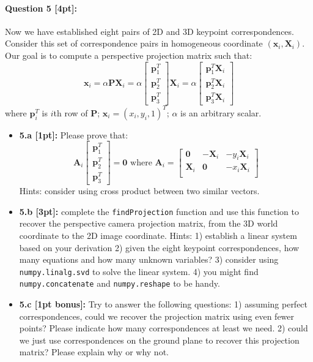 \documentclass[11pt]{article}
\begin{document}
\paragraph{Question 5 [4pt]:} 
Now we have established eight pairs of 2D and 3D keypoint correspondences. 
Consider this set of correspondence pairs in homogeneous coordinate $(\mathbf{x}_i, \mathbf{X}_i)$. Our goal is to compute a perspective projection matrix such that: 
\[
\mathbf{x}_i = \alpha \mathbf{P} \mathbf{X}_i = 
\alpha \left[
\begin{array}{c}
\mathbf{p}_1^T \\
\mathbf{p}_2^T \\
\mathbf{p}_3^T
\end{array}
\right]
\mathbf{X}_i
= 
\alpha \left[
\begin{array}{c}
\mathbf{p}_1^T\mathbf{X}_i \\
\mathbf{p}_2^T\mathbf{X}_i \\
\mathbf{p}_3^T\mathbf{X}_i
\end{array}
\right]
\]
where $\mathbf{p}_i^T$ is $i$th row of $\mathbf{P}$; $\mathbf{x}_i = (x_i, y_i, 1)^T$; $\alpha$ is an arbitrary scalar. 

\begin{itemize}
\item \textbf{5.a [1pt]:} Please prove that:
\[
\mathbf{A}_i 
\left[
\begin{array}{c}
\mathbf{p}_1^T \\
\mathbf{p}_2^T \\
\mathbf{p}_3^T
\end{array}
\right] = \mathbf{0} \textrm{\ where \ } \mathbf{A}_i = \left[
\begin{array}{ccc}
\mathbf{0} & -\mathbf{X}_i & - y_i \mathbf{X}_i \\
\mathbf{X}_i & \mathbf{0} & - x_i \mathbf{X}_i\\
\end{array}
\right]
\]
Hints: consider using cross product between two similar vectors. 
\item \textbf{5.b [3pt]:} complete the \texttt{findProjection} function and use this function to recover the perspective camera projection matrix, from the 3D world coordinate to the 2D image coordinate. Hints: 1) establish a linear system based on your derivation 2) given the eight keypoint correspondences, how many equations and how many unknown variables? 3) consider using \texttt{numpy.linalg.svd} to solve the linear system. 4) you might find \texttt{numpy.concatenate} and \texttt{numpy.reshape} to be handy.  
\item \textbf{5.c [1pt bonus]:} Try to answer the following questions: 1) assuming perfect correspondences, could we recover the projection matrix using even fewer points? Please indicate how many correspondences at least we need. 2) could we just use correspondences on the ground plane to recover this projection matrix? Please explain why or why not.     
\end{itemize}
\end{document}
